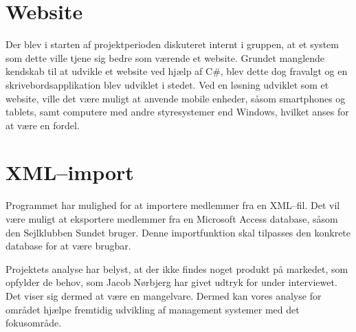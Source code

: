 \section*{Website}
Der blev i starten af projektperioden diskuteret internt i gruppen, at et system som dette ville tjene sig bedre som værende et website.
Grundet manglende kendskab til at udvikle et website ved hjælp af C\#, blev dette dog fravalgt og en skrivebordsapplikation blev udviklet i stedet. 
Ved en løsning udviklet som et website, ville det være muligt at anvende mobile enheder, såsom smartphones og tablets, samt computere med andre styresystemer end Windows, hvilket anses for at være en fordel. 

\section*{XML--import}
Programmet har mulighed for at importere medlemmer fra en XML--fil. 
Det vil være muligt at eksportere medlemmer fra en Microsoft Access database, såsom den Sejlklubben Sundet bruger. 
Denne importfunktion skal tilpasses den konkrete database for at være brugbar.


Projektets analyse har belyst, at der ikke findes noget produkt på markedet, som opfylder de behov, som Jacob Nørbjerg har givet udtryk for under interviewet. 
Det viser sig dermed at være en mangelvare. 
Dermed kan vores analyse for området hjælpe fremtidig udvikling af management systemer med det fokusområde.

